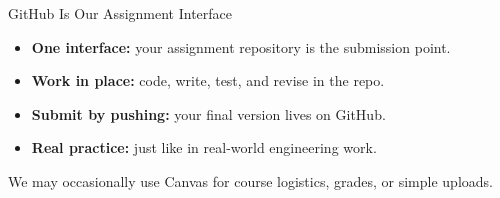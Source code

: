
\begin{frame}{GitHub Is Our Assignment Interface}

  \begin{itemize}
    \item \textbf{One interface:} your assignment repository is the submission point.
    \item \textbf{Work in place:} code, write, test, and revise in the repo.
    \item \textbf{Submit by pushing:} your final version lives on GitHub.
    \item \textbf{Real practice:} just like in real-world engineering work.
  \end{itemize}

  \vspace{1em}
  We may occasionally use Canvas for course logistics, grades, or simple uploads.

\end{frame}
